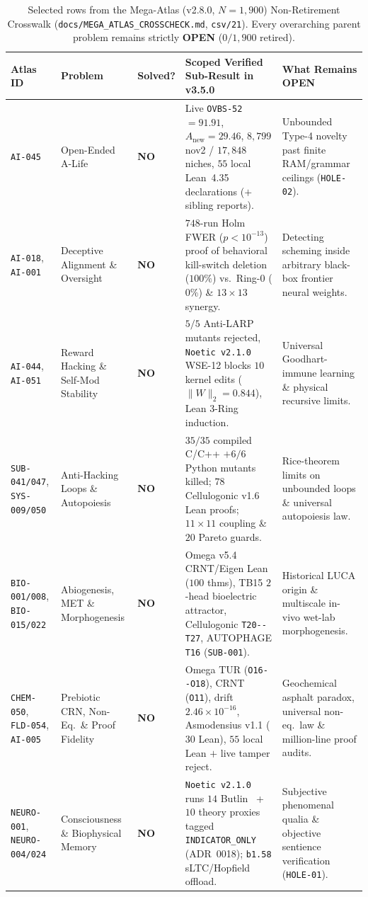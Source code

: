 \documentclass[11pt,reqno]{amsart}
\theoremstyle{plain}
\theoremstyle{definition}
\theoremstyle{remark}
\newcommand{\code}[1]{{\footnotesize\nolinkurl{#1}}}
\newcommand{\tcode}[1]{{\scriptsize\nolinkurl{#1}}}
\begin{document}
\begin{table}[t]
\centering
\caption{Selected rows from the Mega-Atlas (v2.8.0, $N=1{,}900$) Non-Retirement Crosswalk (\code{docs/MEGA_ATLAS_CROSSCHECK.md}, \code{csv/21}). Every overarching parent problem remains strictly \textbf{OPEN} ($0/1{,}900$ retired).}
\label{tab:megaatlas}
\scriptsize
\setlength{\tabcolsep}{3.8pt}
\renewcommand{\arraystretch}{1.14}
\begin{tabularx}{\textwidth}{@{}P{1.65cm}P{2.15cm}P{1.15cm}YP{2.65cm}@{}}
\toprule
\textbf{Atlas ID} & \textbf{Problem} & \textbf{Solved?} & \textbf{Scoped Verified Sub-Result in v3.5.0} & \textbf{What Remains OPEN} \\
\midrule
\tcode{AI-045} & Open-Ended A-Life & \textbf{NO} & Live \tcode{OVBS-52} $=91.91$, $A_{\mathrm{new}}=29.46$, $8{,}799$ nov2 / $17{,}848$ niches, $55$ local Lean~4.35 declarations ($+$ sibling reports). & Unbounded Type-4 novelty past finite RAM/grammar ceilings (\tcode{HOLE-02}). \\
\tcode{AI-018}, \tcode{AI-001} & Deceptive Alignment \& Oversight & \textbf{NO} & $748$-run Holm FWER ($p<10^{-13}$) proof of behavioral kill-switch deletion ($100\%$) vs.\ Ring-0 ($0\%$) \& $13{\times}13$ synergy. & Detecting scheming inside arbitrary black-box frontier neural weights. \\
\tcode{AI-044}, \tcode{AI-051} & Reward Hacking \& Self-Mod Stability & \textbf{NO} & $5/5$ Anti-LARP mutants rejected, \tcode{Noetic v2.1.0} WSE-12 blocks $10$ kernel edits ($\|W\|_2=0.844$), Lean 3-Ring induction. & Universal Goodhart-immune learning \& physical recursive limits. \\
\tcode{SUB-041/047}, \tcode{SYS-009/050} & Anti-Hacking Loops \& Autopoiesis & \textbf{NO} & $35/35$ compiled C/C++ $+ 6/6$ Python mutants killed; $78$ Cellulogonic v1.6 Lean proofs; $11{\times}11$ coupling \& $20$ Pareto guards. & Rice-theorem limits on unbounded loops \& universal autopoiesis law. \\
\tcode{BIO-001/008}, \tcode{BIO-015/022} & Abiogenesis, MET \& Morphogenesis & \textbf{NO} & Omega v5.4 CRNT/Eigen Lean ($100$ thms), TB15 $2$-head bioelectric attractor, Cellulogonic \tcode{T20--T27}, AUTOPHAGE \tcode{T16} (\tcode{SUB-001}). & Historical LUCA origin \& multiscale in-vivo wet-lab morphogenesis. \\
\tcode{CHEM-050}, \tcode{FLD-054}, \tcode{AI-005} & Prebiotic CRN, Non-Eq.\ \& Proof Fidelity & \textbf{NO} & Omega TUR (\tcode{O16--O18}), CRNT (\tcode{O11}), drift $2.46\times 10^{-16}$, Asmodensius v1.1 ($30$ Lean), $55$ local Lean $+$ live tamper reject. & Geochemical asphalt paradox, universal non-eq.\ law \& million-line proof audits. \\
\tcode{NEURO-001}, \tcode{NEURO-004/024} & Consciousness \& Biophysical Memory & \textbf{NO} & \tcode{Noetic v2.1.0} runs $14$ Butlin~\cite{butlin2023consciousness} + $10$ theory proxies tagged \tcode{INDICATOR_ONLY} (ADR~0018); \tcode{b1.58} sLTC/Hopfield offload. & Subjective phenomenal qualia \& objective sentience verification (\tcode{HOLE-01}). \\
\bottomrule
\end{tabularx}
\end{table}
\end{document}
